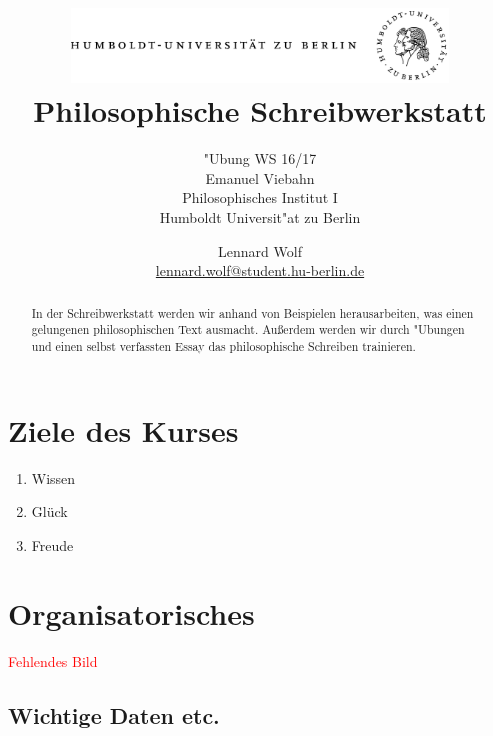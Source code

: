 \documentclass[]{scrartcl}
\begin{document}
\title{
	\includegraphics*[width=0.75\textwidth]{images/hu_logo.png}\\
	\vspace{24pt}
	Philosophische Schreibwerkstatt}
\subtitle{"Ubung WS 16/17\\
          Emanuel Viebahn\\
          Philosophisches Institut I \\ 
          Humboldt Universit"at zu Berlin}
\author{Lennard Wolf\\
        \href{mailto:lennard.wolf@student.hu-berlin.de}{lennard.wolf@student.hu-berlin.de}}
\maketitle
\begin{abstract}

In der Schreibwerkstatt werden wir anhand von Beispielen herausarbeiten, was einen gelungenen philosophischen Text ausmacht. Au\ss erdem werden wir durch "Ubungen und einen selbst verfassten Essay das philosophische Schreiben trainieren.

\end{abstract}
\newpage

\tableofcontents
\newpage

\listoffigures
\newpage


\section{Ziele des Kurses}
\begin{enumerate}
  \item Wissen
  \item Glück
  \item Freude
\end{enumerate}

\section{Organisatorisches}

\textcolor{red}{Fehlendes Bild}

\subsection{Wichtige Daten etc.}
\end{document}
